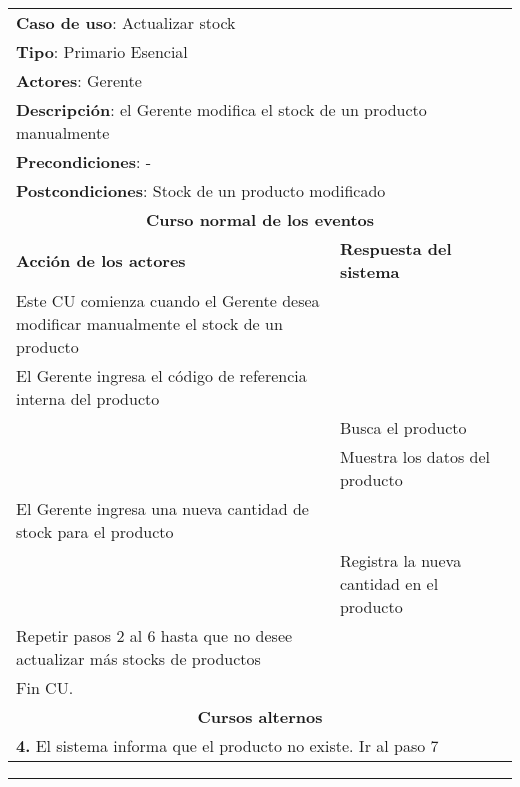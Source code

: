


	\begin{longtable}{ |p{8cm}|p{8cm}| }
		\hline
		\multicolumn{2}{|p{16cm}|}{\textbf{Caso de uso}: Actualizar stock}\\
		\multicolumn{2}{|p{16cm}|}{\textbf{Tipo}: Primario Esencial}\\
		\multicolumn{2}{|p{16cm}|}{\textbf{Actores}: Gerente}\\
		\multicolumn{2}{|p{16cm}|}{\textbf{Descripción}: el Gerente modifica el stock de un producto manualmente}\\
		\multicolumn{2}{|p{16cm}|}{\textbf{Precondiciones}: -}\\
        \multicolumn{2}{|p{16cm}|}{\textbf{Postcondiciones}: Stock de un producto modificado}\\
		\hline
		\multicolumn{2}{|c|}{\textbf{Curso normal de los eventos}}\\
		\hline
		\textbf{Acción de los actores} & \textbf{Respuesta del sistema}\\
		\hline
			\inc Este CU comienza cuando el Gerente desea modificar manualmente el stock de un producto& \\
			\hline
			\inc  El Gerente ingresa el código de referencia interna del producto& \\
			\hline
			\inc  & Busca el producto \\
			\hline
			\inc  & Muestra los datos del producto\\
			\hline


			\inc El Gerente ingresa una nueva cantidad de stock para el producto & \\
			\hline
			\inc  & Registra la nueva cantidad en el producto\\
			\hline
			\inc  Repetir pasos 2 al 6 hasta que no desee actualizar más stocks de productos& \\
			\hline
			\inc Fin CU. & \\


		\hline
		\multicolumn{2}{|c|}{\textbf{Cursos alternos}}\\
		\hline
		\multicolumn{2}{|p{16cm}|}{\textbf{4. }El sistema informa que el producto no existe. Ir al paso 7}\\
		\hline
	\end{longtable}


    \setcounter{step}{0}

    \noindent\rule{169mm}{0.8mm}\\
